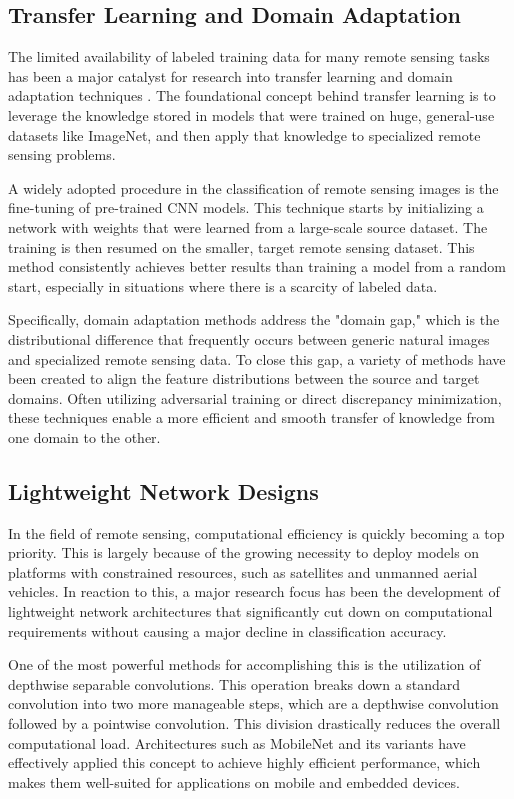 \documentclass[12pt,a4paper]{article}
\begin{document}
\subsection{Transfer Learning and Domain Adaptation}
The limited availability of labeled training data for many remote sensing tasks has been a major catalyst for research into transfer learning and domain adaptation techniques \cite{zhu2017deep}. The foundational concept behind transfer learning is to leverage the knowledge stored in models that were trained on huge, general-use datasets like ImageNet, and then apply that knowledge to specialized remote sensing problems.

A widely adopted procedure in the classification of remote sensing images is the fine-tuning of pre-trained CNN models. This technique starts by initializing a network with weights that were learned from a large-scale source dataset. The training is then resumed on the smaller, target remote sensing dataset. This method consistently achieves better results than training a model from a random start, especially in situations where there is a scarcity of labeled data.

Specifically, domain adaptation methods address the "domain gap," which is the distributional difference that frequently occurs between generic natural images and specialized remote sensing data. To close this gap, a variety of methods have been created to align the feature distributions between the source and target domains. Often utilizing adversarial training or direct discrepancy minimization, these techniques enable a more efficient and smooth transfer of knowledge from one domain to the other.

\subsection{Lightweight Network Designs}
In the field of remote sensing, computational efficiency is quickly becoming a top priority. This is largely because of the growing necessity to deploy models on platforms with constrained resources, such as satellites and unmanned aerial vehicles. In reaction to this, a major research focus has been the development of lightweight network architectures that significantly cut down on computational requirements without causing a major decline in classification accuracy.

One of the most powerful methods for accomplishing this is the utilization of depthwise separable convolutions. This operation breaks down a standard convolution into two more manageable steps, which are a depthwise convolution followed by a pointwise convolution. This division drastically reduces the overall computational load. Architectures such as MobileNet and its variants have effectively applied this concept to achieve highly efficient performance, which makes them well-suited for applications on mobile and embedded devices.
\end{document}

